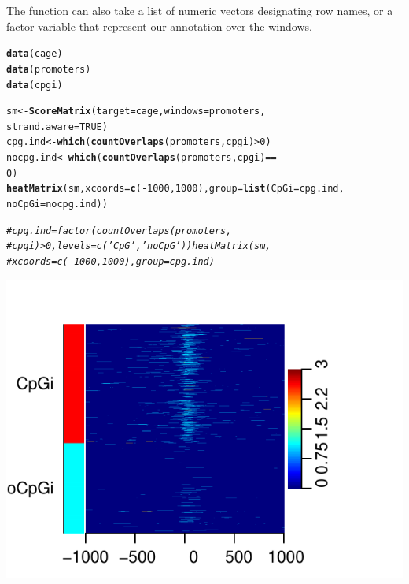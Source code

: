 \documentclass{article}\usepackage[]{graphicx}\usepackage[]{color}
\makeatletter
\newcommand{\hlnum}[1]{\textcolor[rgb]{0.686,0.059,0.569}{#1}}%
\newcommand{\hlcom}[1]{\textcolor[rgb]{0.678,0.584,0.686}{\textit{#1}}}%
\newcommand{\hlopt}[1]{\textcolor[rgb]{0,0,0}{#1}}%
\newcommand{\hlstd}[1]{\textcolor[rgb]{0.345,0.345,0.345}{#1}}%
\newcommand{\hlkwb}[1]{\textcolor[rgb]{0.69,0.353,0.396}{#1}}%
\newcommand{\hlkwc}[1]{\textcolor[rgb]{0.333,0.667,0.333}{#1}}%
\newcommand{\hlkwd}[1]{\textcolor[rgb]{0.737,0.353,0.396}{\textbf{#1}}}%
\newenvironment{kframe}{%
 \def\at@end@of@kframe{}%
 \ifinner\ifhmode%
  \def\at@end@of@kframe{\end{minipage}}%
  \begin{minipage}{\columnwidth}%
 \fi\fi%
 \def\FrameCommand##1{\hskip\@totalleftmargin \hskip-\fboxsep
 \colorbox{shadecolor}{##1}\hskip-\fboxsep
     \hskip-\linewidth \hskip-\@totalleftmargin \hskip\columnwidth}%
 \MakeFramed {\advance\hsize-\width
   \@totalleftmargin\z@ \linewidth\hsize
   \@setminipage}}%
 {\par\unskip\endMakeFramed%
 \at@end@of@kframe}
\newenvironment{knitrout}{}{} %
\makeatother
\begin{document}
The  function can also take a list of numeric vectors designating row names, or a factor variable that represent our annotation over the windows.
\begin{knitrout}
\color{fgcolor}\begin{kframe}
\begin{alltt}
\hlkwd{data}\hlstd{(cage)}
\hlkwd{data}\hlstd{(promoters)}
\hlkwd{data}\hlstd{(cpgi)}

\hlstd{sm} \hlkwb{<-} \hlkwd{ScoreMatrix}\hlstd{(}\hlkwc{target} \hlstd{= cage,} \hlkwc{windows} \hlstd{= promoters,}
    \hlkwc{strand.aware} \hlstd{=} \hlnum{TRUE}\hlstd{)}
\hlstd{cpg.ind} \hlkwb{<-} \hlkwd{which}\hlstd{(}\hlkwd{countOverlaps}\hlstd{(promoters, cpgi)} \hlopt{>} \hlnum{0}\hlstd{)}
\hlstd{nocpg.ind} \hlkwb{<-} \hlkwd{which}\hlstd{(}\hlkwd{countOverlaps}\hlstd{(promoters, cpgi)} \hlopt{==}
    \hlnum{0}\hlstd{)}
\hlkwd{heatMatrix}\hlstd{(sm,} \hlkwc{xcoords} \hlstd{=} \hlkwd{c}\hlstd{(}\hlopt{-}\hlnum{1000}\hlstd{,} \hlnum{1000}\hlstd{),} \hlkwc{group} \hlstd{=} \hlkwd{list}\hlstd{(}\hlkwc{CpGi} \hlstd{= cpg.ind,}
    \hlkwc{noCpGi} \hlstd{= nocpg.ind))}

\hlcom{# cpg.ind = factor(countOverlaps(promoters,}
\hlcom{# cpgi)>0, levels=c('CpG','noCpG')) heatMatrix(sm,}
\hlcom{# xcoords=c(-1000, 1000), group=cpg.ind)}
\end{alltt}
\end{kframe}

{\centering \includegraphics[width=.49\linewidth]{inst/doc/FiguresheatMatrix2} 

}



\end{knitrout}
\end{document}
